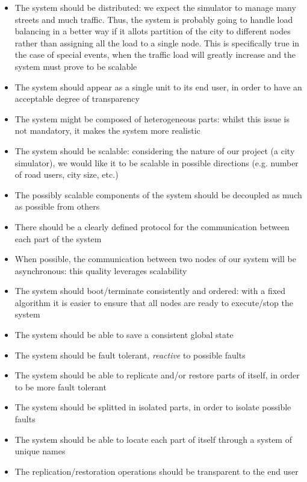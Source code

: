 \begin{itemize}
\item The system should be distributed: we expect the simulator to manage many
  streets and much traffic. Thus, the system is probably going to handle load balancing 
  in a better way if it allots partition of the city to different nodes rather than assigning 
  all the load to a single node. This is specifically true in the case of special events, 
  when the traffic load will greatly increase and the system must prove to be scalable
\item The system should appear as a single unit to its end user, in order to
  have an acceptable degree of transparency
\item The system might be composed of heterogeneous parts: whilst this issue
  is not mandatory, it makes the system more realistic
\item The system should be scalable: considering the nature of our project (a
  city simulator), we would like it to be scalable in possible directions
  (e.g. number of road users, city size, etc.)
\item The possibly scalable components of the system should be decoupled as much as possible from others
\item There should be a clearly defined protocol for the communication between
  each part of the system
\item When possible, the communication between two nodes of our system will be
  asynchronous: this quality leverages scalability
\item The system should boot/terminate consistently and ordered: with a fixed
  algorithm it is easier to ensure that all nodes are ready to execute/stop the
  system
\item The system should be able to save a consistent global state
\item The system should be fault tolerant, \emph{reactive} to possible faults
\item The system should be able to replicate and/or restore parts of itself,
  in order to be more fault tolerant
\item The system should be splitted in isolated parts, in order to isolate possible faults
\item The system should be able to locate each part of itself through a system
  of unique names
\item The replication/restoration operations should be transparent to the end user
\end{itemize}

